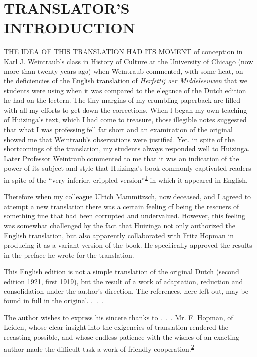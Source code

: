 \chapter{TRANSLATOR'S INTRODUCTION}

THE IDEA OF THIS TRANSLATION HAD ITS MOMENT of conception in Karl J.
Weintraub's class in History of Culture at the University of Chicago
(now more than twenty years ago) when Weintraub commented, with some
heat, on the deficiencies of the English translation of \emph{Herfsttij
der Middeleeuwen} that we students were using when it was compared to
the elegance of the Dutch edition he had on the lectern. The tiny
margins of my crumbling paperback are filled with all my efforts to get
down the corrections. When I began my own teaching of Huizinga's text,
which I had come to treasure, those illegible notes suggested that what
I was professing fell far short and an examination of the original
showed me that Weintraub's observations were justified. Yet, in spite of
the shortcomings of the translation, my students always responded well
to Huizinga. Later Professor Weintraub commented to me that it was an
indication of the power of its subject and style that Huizinga's book
commonly captivated readers in spite of the ``very inferior, crippled
version''\textsuperscript{\protect\hypertarget{05_TRANSLATOR_S_INTRODUCTION.xhtmlux5cux23id_2247}{\protect\hyperlink{23_NOTES.xhtmlux5cux23id_2248}{1}}}
in which it appeared in English.

Therefore when my colleague Ulrich Mammitzsch, now deceased, and I
agreed to attempt a new translation there was a certain feeling of being
the rescuers of something fine that had been corrupted and undervalued.
However, this feeling was somewhat challenged by the fact that Huizinga
not only authorized the English translation, but also apparently
collaborated with Fritz Hopman in producing it as a variant version of
the book. He specifically approved the results in the preface he wrote
for the translation.

This English edition is not a simple translation of the original Dutch
(second edition 1921, first 1919), but the result of a work of
adaptation, reduction and consolidation under the author's direction.
The references, here left out, may be found in full in the original.
.~.~.

\protect\hypertarget{05_TRANSLATOR_S_INTRODUCTION.xhtmlux5cux23page_x}{}{}The
author wishes to express his sincere thanks to .~.~. Mr. F. Hopman, of
Leiden, whose clear insight into the exigencies of translation rendered
the recasting possible, and whose endless patience with the wishes of an
exacting author made the difficult task a work of friendly
cooperation.\textsuperscript{\protect\hypertarget{05_TRANSLATOR_S_INTRODUCTION.xhtmlux5cux23id_2245}{\protect\hyperlink{23_NOTES.xhtmlux5cux23id_2246}{2}}}

